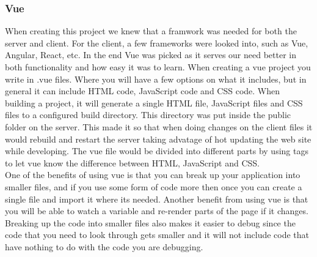 \subsubsection{Vue}
When creating this project we knew that a framwork was needed for both the server and client. For the client, a few frameworks were looked into, such as Vue, Angular\cite{Angular:Info}, React\cite{React:Info}, etc. In the end Vue was picked as it serves our need better in both functionality and how easy it was to learn. When creating a vue project you write in .vue files. Where you will have a few options on what it includes, but in general it can include HTML code, JavaScript code and CSS code. When building a project, it will generate a single HTML file, JavaScript files and CSS files to a configured build directory. This directory was put inside the public folder on the server. This made it so that when doing changes on the client files it would rebuild and restart the server taking advatage of hot updating the web site while developing. The vue file would be divided into different parts by using tags to let vue know the difference between HTML, JavaScript and CSS.
\\[11pt]
One of the benefits of using vue is that you can break up your application into smaller files, and if you use some form of code more then once you can create a single file and import it where its needed. Another benefit from using vue is that you will be able to watch a variable and re-render parts of the page if it changes. Breaking up the code into smaller files also makes it easier to debug since the code that you need to look through gets smaller and it will not include code that have nothing to do with the code you are debugging.
\\[11pt]
